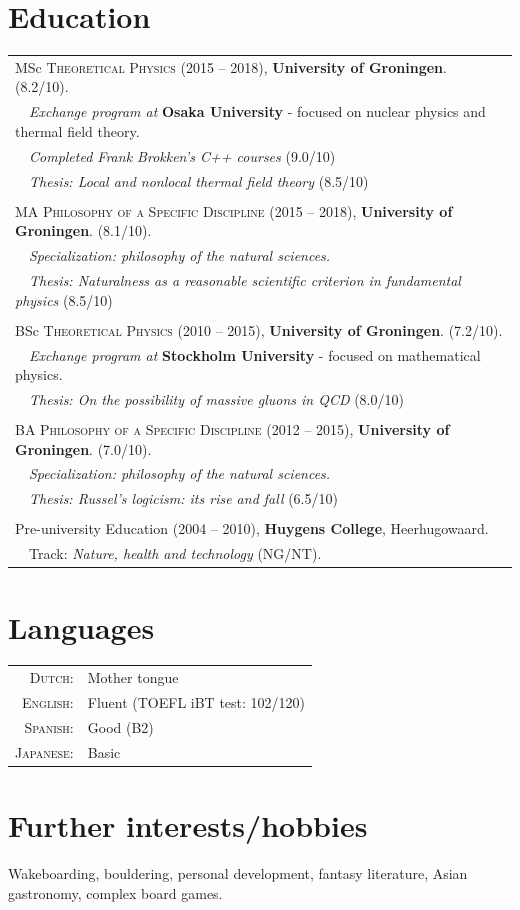 \documentclass[a4paper,8pt]{article}
\begin{document}
\section{Education}
\begin{tabular}{l}
MSc \textsc{Theoretical Physics} (2015 -- 2018), \textbf{University of Groningen}. (8.2/10).\\
\ \ \textit{Exchange program at} \textbf{Osaka University} - focused on nuclear physics and thermal field theory. \\
\ \ \textit{Completed Frank Brokken's C++ courses} (9.0/10) \\
\ \ \textit{Thesis: Local and nonlocal thermal field theory} (8.5/10)
\\ \\
 MA \textsc{Philosophy of a Specific Discipline} (2015 -- 2018),
\textbf{University of Groningen}. (8.1/10). \\ 
\ \ \textit{Specialization: philosophy of the natural sciences.} \\
\ \ \textit{Thesis: Naturalness as a reasonable scientific criterion in fundamental physics} (8.5/10)
\\ \\
 BSc \textsc{Theoretical Physics} (2010 --  2015), \textbf{University of Groningen}. (7.2/10).\\ 
\ \ \textit{Exchange program at} \textbf{Stockholm University} - focused on mathematical physics. \\
 \ \ \textit{Thesis: On the possibility of massive gluons in QCD} (8.0/10) \\
 \\
 BA \textsc{Philosophy of a Specific Discipline} (2012 --  2015), \textbf{University of Groningen}. (7.0/10). \\
\ \  \textit{Specialization: philosophy of the natural sciences.} \\
\ \ \textit{Thesis: Russel's logicism: its rise and fall} (6.5/10) \\
 \\
 Pre-university Education (2004 --  2010), \textbf{Huygens College}, Heerhugowaard. \\ 
\ \ Track: \textit{Nature, health and technology} (NG/NT).
\end{tabular}

\section{Languages}
\begin{tabular}{rl}
 \textsc{Dutch:}&Mother tongue\\
\textsc{English:}&Fluent (TOEFL iBT test: 102/120)\\
\textsc{Spanish:}&Good (B2)\\
\textsc{Japanese:}&Basic
\end{tabular}


\section{Further interests/hobbies}
Wakeboarding, bouldering, personal development, fantasy literature, Asian gastronomy, complex board games.
\end{document}
